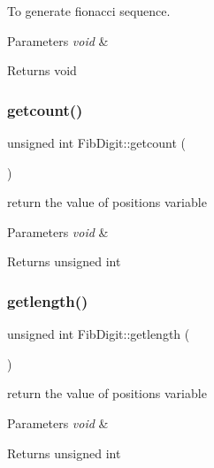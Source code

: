 To generate fionacci sequence. 


\begin{DoxyParams}{Parameters}
{\em void} & \\
\hline
\end{DoxyParams}
\begin{DoxyReturn}{Returns}
void 
\end{DoxyReturn}
\mbox{\label{classFibDigit_af7c8489aab55c20fece480e96742ca50}} 
\subsubsection{\texorpdfstring{getcount()}{getcount()}}
{\footnotesize\ttfamily unsigned int Fib\+Digit\+::getcount (\begin{DoxyParamCaption}\item[{void}]{ }\end{DoxyParamCaption})\hspace{0.3cm}{\ttfamily [inline]}}



return the value of positions variable 


\begin{DoxyParams}{Parameters}
{\em void} & \\
\hline
\end{DoxyParams}
\begin{DoxyReturn}{Returns}
unsigned int 
\end{DoxyReturn}
\mbox{\label{classFibDigit_af4de1f9f55c71692d86035e017265947}} 
\subsubsection{\texorpdfstring{getlength()}{getlength()}}
{\footnotesize\ttfamily unsigned int Fib\+Digit\+::getlength (\begin{DoxyParamCaption}\item[{void}]{ }\end{DoxyParamCaption})\hspace{0.3cm}{\ttfamily [inline]}}



return the value of positions variable 


\begin{DoxyParams}{Parameters}
{\em void} & \\
\hline
\end{DoxyParams}
\begin{DoxyReturn}{Returns}
unsigned int 
\end{DoxyReturn}
\mbox{\label{classFibDigit_a4f2ec44ac3d289a908cfdf11b2d84a59}} 
